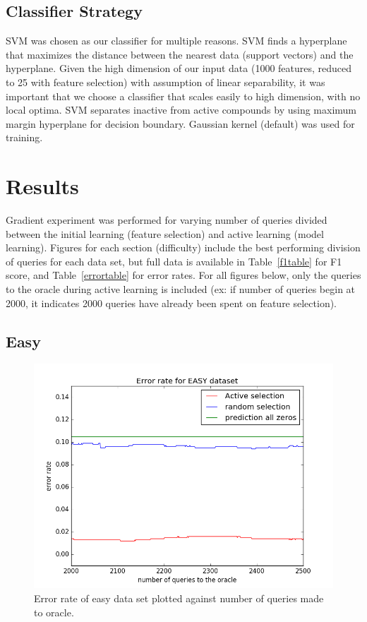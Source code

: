 \documentclass[paper=a4, fontsize=11pt]{scrartcl}
\numberwithin{equation}{section}    %
\numberwithin{figure}{section}      %
\numberwithin{table}{section}       %
\numberwithin{equation}{section}    %
\numberwithin{figure}{section}      %
\numberwithin{table}{section}       %
\begin{document}
\subsection{Classifier Strategy}

SVM was chosen as our classifier for multiple reasons. SVM finds a hyperplane that maximizes the distance between the nearest data (support vectors) and the hyperplane. Given the high dimension of our input data (1000 features, reduced to 25 with feature selection) with assumption of linear separability, it was important that we choose a classifier that scales easily to high dimension, with no local optima. SVM separates inactive from active compounds by using maximum margin hyperplane for decision boundary. 
Gaussian kernel (default) was used for training. 


\section{Results}

Gradient experiment was performed for varying number of queries divided between the initial learning (feature selection) and active learning (model learning). Figures for each section (difficulty) include the best performing division of queries for each data set, but full data is available in Table~\ref{f1table} for F1 score, and Table~\ref{errortable} for error rates. For all figures below, only the queries to the oracle during active learning is included (ex: if number of queries begin at 2000, it indicates 2000 queries have already been spent on feature selection). 
\subsection{Easy}


\begin{figure}[!htb]
  \centering
  \includegraphics[scale = 0.5]{figures/error_easy.png}
      \caption{Error rate of easy data set plotted against number of queries made to oracle.}
      \label{easyerror}
\end{figure}
\end{document}
